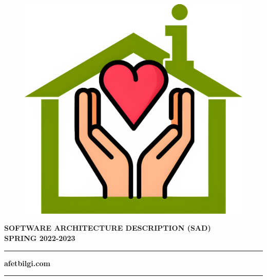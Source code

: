 \begin{titlepage}
\begin{center}
  \begin{figure}[ht]
    \centering
    \includegraphics[width=.5\linewidth]{img/afetbilgi.jpg}
  \end{figure}

  \vspace{16pt}
  \large{
    \textbf{SOFTWARE ARCHITECTURE DESCRIPTION (SAD)}
  } \\
  \large{
    \textbf{SPRING 2022-2023}
  }

  \rule{12cm}{1pt}

  \large{\textbf{afetbilgi.com}}
  \vspace{-7pt}

  \rule{12cm}{1pt}

  \vspace{48pt}
  \begin{minipage}{.45\textwidth}
    \centering
  \end{minipage}
  \hfill
  \begin{minipage}{.45\textwidth}
    \centering
  \end{minipage}
  
  \end{center}
\end{titlepage}
  